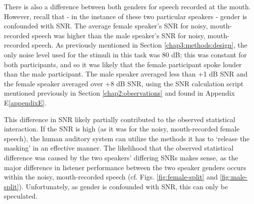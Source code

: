 There is also a difference between both genders for speech recorded at the mouth.
However, recall that - in the instance of these two particular speakers - gender is confounded with SNR.  The average female speaker's SNR for noisy, mouth-recorded speech was higher than the male speaker's SNR for noisy, mouth-recorded speech.  As previously mentioned in Section \ref{chap3:methods:design}, the only noise level used for the stimuli in this task was 80 dB; this was constant for both participants, and so it was likely that the female participant spoke louder than the male participant.  The male speaker averaged less than +1 dB SNR and the female speaker averaged over +8 dB SNR, using the SNR calculation script mentioned previously in Section \ref{chap2:observations} and found in Appendix E\ref{appendixE}.

This difference in SNR likely partially contributed to the observed statistical interaction.  If the SNR is high (as it was for the noisy, mouth-recorded female speech), the human auditory system can utilize the methods it has to `release the masking' in an effective manner.  The likelihood that the observed statistical difference was caused by the two speakers' differing SNRs makes sense, as the major difference in listener performance between the two speaker genders occurs within the noisy, mouth-recorded speech (cf. Figs. \ref{fig:female-split} and \ref{fig:male-split}).  Unfortunately, as gender is confounded with SNR, this can only be speculated.




